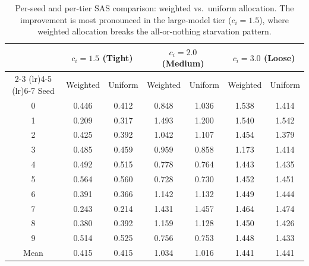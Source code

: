 \begin{table}[t]
\centering
\caption{Per-seed and per-tier SAS comparison: weighted vs.\ uniform allocation. The improvement is most pronounced in the large-model tier ($c_i = 1.5$), where weighted allocation breaks the all-or-nothing starvation pattern.}
\label{tab:ablation-tier}
\begin{tabular}{ccccccc}
\toprule
 & \multicolumn{2}{c}{$c_i = 1.5$ (Tight)} & \multicolumn{2}{c}{$c_i = 2.0$ (Medium)} & \multicolumn{2}{c}{$c_i = 3.0$ (Loose)} \\
\cmidrule(lr){2-3} \cmidrule(lr){4-5} \cmidrule(lr){6-7}
Seed & Weighted & Uniform & Weighted & Uniform & Weighted & Uniform \\
\midrule
0 & 0.446 & 0.412 & 0.848 & 1.036 & 1.538 & 1.414 \\
1 & 0.209 & 0.317 & 1.493 & 1.200 & 1.540 & 1.542 \\
2 & 0.425 & 0.392 & 1.042 & 1.107 & 1.454 & 1.379 \\
3 & 0.485 & 0.459 & 0.959 & 0.858 & 1.173 & 1.414 \\
4 & 0.492 & 0.515 & 0.778 & 0.764 & 1.443 & 1.435 \\
5 & 0.564 & 0.560 & 0.728 & 0.730 & 1.452 & 1.451 \\
6 & 0.391 & 0.366 & 1.142 & 1.132 & 1.449 & 1.444 \\
7 & 0.243 & 0.214 & 1.431 & 1.457 & 1.464 & 1.474 \\
8 & 0.380 & 0.392 & 1.159 & 1.128 & 1.450 & 1.426 \\
9 & 0.514 & 0.525 & 0.756 & 0.753 & 1.448 & 1.433 \\
\midrule
Mean & 0.415 & 0.415 & 1.034 & 1.016 & 1.441 & 1.441 \\
\bottomrule
\end{tabular}
\end{table}
